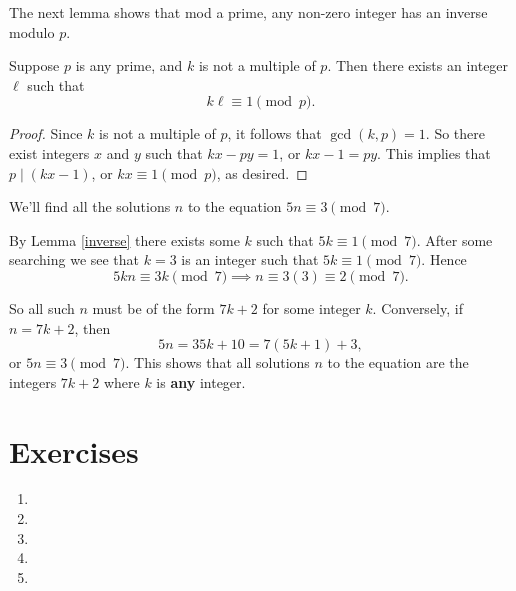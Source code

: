 The next lemma shows that mod a prime, any non-zero integer has an inverse modulo $p$.

\begin{lemma} \label{inverse}
Suppose $p$ is any prime, and $k$ is not a multiple of $p$. Then there exists an integer $\ell$ such that 
\[k \ell \equiv 1 \pmod{p}.\]
\end{lemma}

\begin{proof}
Since $k$ is not a multiple of $p$, it follows that $\gcd(k, p) = 1$. So there exist integers $x$ and $y$ such that $kx - py = 1$, or $kx - 1 = py$. This implies that $p \mid (kx - 1)$, or $kx \equiv 1 \pmod{p}$, as desired.
\end{proof}

\begin{example}
We'll find all the solutions $n$ to the equation $5n \equiv 3 \pmod{7}$.
\begin{tcolorbox}
 By Lemma \ref{inverse} there exists some $k$ such that $5k \equiv 1 \pmod{7}$. After some searching we see that $k = 3$ is an integer such that $5k \equiv 1 \pmod{7}$. Hence
 \[5kn \equiv 3k \pmod{7} \implies n \equiv 3(3) \equiv 2 \pmod{7}.\]
 
 So all such $n$ must be of the form $7k + 2$ for some integer $k$. Conversely, if $n = 7k + 2$, then 
 \[5n = 35k + 10 = 7(5k + 1) + 3,\] or $5n \equiv 3 \pmod{7}$. This shows that all solutions $n$ to the equation are the integers $7k + 2$ where $k$ is \textbf{any} integer.
\end{tcolorbox}
\end{example}

\section{Exercises}
 \begin{enumerate}
   \item 
   \item 
   \item 
   \item 
   \item 
 \end{enumerate}
